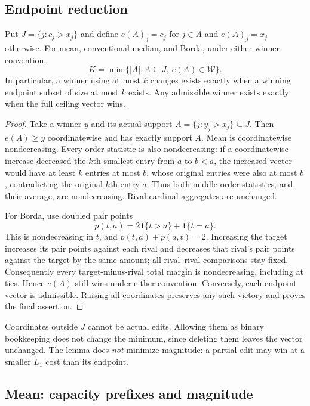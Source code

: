 \subsection{Endpoint reduction}
\label{app:endpoints}

\begin{applemma}
\label{app:lemma:endpoint}
Put $J=\{j:c_j>x_j\}$ and define $e(A)_j=c_j$ for $j\in A$ and $e(A)_j=x_j$ otherwise. For mean, conventional median, and Borda, under either winner convention,
\begin{equation}
 K=\min\{|A|:A\subseteq J,\ e(A)\in\mathcal W\}.
 \label{app:endpointminimum}
\end{equation}
In particular, a winner using at most $k$ changes exists exactly when a winning endpoint subset of size at most $k$ exists. Any admissible winner exists exactly when the full ceiling vector wins.
\end{applemma}
\begin{proof}
Take a winner $y$ and its actual support $A=\{j:y_j>x_j\}\subseteq J$. Then $e(A)\geq y$ coordinatewise and has exactly support $A$. Mean is coordinatewise nondecreasing. Every order statistic is also nondecreasing: if a coordinatewise increase decreased the $k$th smallest entry from $a$ to $b<a$, the increased vector would have at least $k$ entries at most $b$, whose original entries were also at most $b$, contradicting the original $k$th entry $a$. Thus both middle order statistics, and their average, are nondecreasing. Rival cardinal aggregates are unchanged.

For Borda, use doubled pair points
\[
 p(t,a)=2\mathbf{1}\{t>a\}+\mathbf{1}\{t=a\}.
\]
This is nondecreasing in $t$, and $p(t,a)+p(a,t)=2$. Increasing the target increases its pair points against each rival and decreases that rival's pair points against the target by the same amount; all rival--rival comparisons stay fixed. Consequently every target-minus-rival total margin is nondecreasing, including at ties. Hence $e(A)$ still wins under either convention. Conversely, each endpoint vector is admissible. Raising all coordinates preserves any such victory and proves the final assertion.
\end{proof}
Coordinates outside $J$ cannot be actual edits. Allowing them as binary bookkeeping does not change the minimum, since deleting them leaves the vector unchanged. The lemma does \emph{not} minimize magnitude: a partial edit may win at a smaller $L_1$ cost than its endpoint.

\subsection{Mean: capacity prefixes and magnitude}
\label{app:mean}

